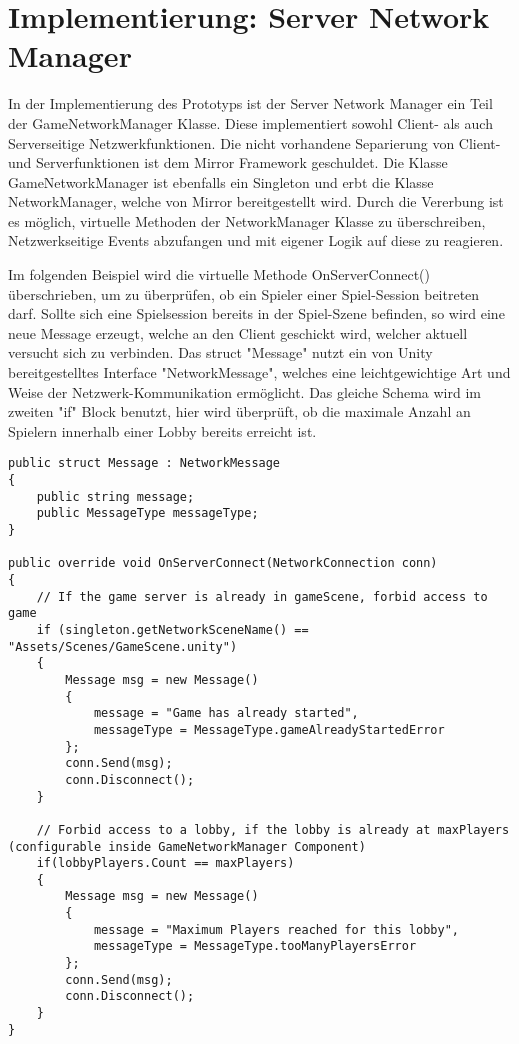 \section{Implementierung: Server Network Manager}

In der Implementierung des Prototyps ist der Server Network Manager ein Teil der GameNetworkManager Klasse. Diese implementiert sowohl Client- als auch Serverseitige Netzwerkfunktionen. Die nicht vorhandene Separierung von Client-und Serverfunktionen ist dem Mirror Framework geschuldet. Die Klasse GameNetworkManager ist ebenfalls ein Singleton und erbt die Klasse NetworkManager, welche von Mirror bereitgestellt wird. Durch die Vererbung ist es möglich, virtuelle Methoden\cite{Billwagner.08.02.2022} der NetworkManager Klasse zu überschreiben, Netzwerkseitige Events abzufangen und mit eigener Logik auf diese zu reagieren. 

Im folgenden Beispiel wird die virtuelle Methode OnServerConnect() überschrieben, um zu überprüfen, ob ein Spieler einer Spiel-Session beitreten darf. Sollte sich eine Spielsession bereits in der Spiel-Szene befinden, so wird eine neue Message erzeugt, welche an den Client geschickt wird, welcher aktuell versucht sich zu verbinden. Das struct "Message" nutzt ein von Unity bereitgestelltes Interface "NetworkMessage", welches eine leichtgewichtige Art und Weise der Netzwerk-Kommunikation ermöglicht. Das gleiche Schema wird im zweiten "if" Block benutzt, hier wird überprüft, ob die maximale Anzahl an Spielern innerhalb einer Lobby bereits erreicht ist.

\begin{lstlisting}[caption= GameNetworkManager.cs OnServerConnect() und Message struct]
public struct Message : NetworkMessage
{
	public string message;
	public MessageType messageType;
}
	
public override void OnServerConnect(NetworkConnection conn)
{
	// If the game server is already in gameScene, forbid access to game
	if (singleton.getNetworkSceneName() == "Assets/Scenes/GameScene.unity")
	{
		Message msg = new Message()
		{
			message = "Game has already started",
			messageType = MessageType.gameAlreadyStartedError
		};
		conn.Send(msg);
		conn.Disconnect();
	}
	
	// Forbid access to a lobby, if the lobby is already at maxPlayers (configurable inside GameNetworkManager Component)
	if(lobbyPlayers.Count == maxPlayers)
	{
		Message msg = new Message()
		{
			message = "Maximum Players reached for this lobby",
			messageType = MessageType.tooManyPlayersError
		};
		conn.Send(msg);
		conn.Disconnect();
	}
}
\end{lstlisting}

